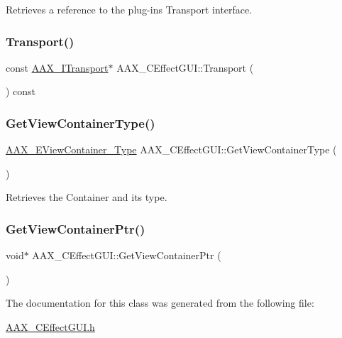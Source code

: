 Retrieves a reference to the plug-\/in\textquotesingle{}s Transport interface. 

\mbox{\label{a01477_a7330c595add500a079761e24e6067d57}} 
\subsubsection{\texorpdfstring{Transport()}{Transport()}\hspace{0.1cm}{\footnotesize\ttfamily [2/2]}}
{\footnotesize\ttfamily const \mbox{\hyperlink{a01885}{A\+A\+X\+\_\+\+I\+Transport}}$\ast$ A\+A\+X\+\_\+\+C\+Effect\+G\+U\+I\+::\+Transport (\begin{DoxyParamCaption}{ }\end{DoxyParamCaption}) const}

\mbox{\label{a01477_a010cc00926a3d219fa4de47ac182eb9b}} 
\subsubsection{\texorpdfstring{GetViewContainerType()}{GetViewContainerType()}}
{\footnotesize\ttfamily \mbox{\hyperlink{a00503_a89d5cb8c7fdb11f34e695fb0e057b764}{A\+A\+X\+\_\+\+E\+View\+Container\+\_\+\+Type}} A\+A\+X\+\_\+\+C\+Effect\+G\+U\+I\+::\+Get\+View\+Container\+Type (\begin{DoxyParamCaption}{ }\end{DoxyParamCaption})}



Retrieves the Container and it\textquotesingle{}s type. 

\mbox{\label{a01477_a0bd9e15c41584fb9a53ff5724e5db330}} 
\subsubsection{\texorpdfstring{GetViewContainerPtr()}{GetViewContainerPtr()}}
{\footnotesize\ttfamily void$\ast$ A\+A\+X\+\_\+\+C\+Effect\+G\+U\+I\+::\+Get\+View\+Container\+Ptr (\begin{DoxyParamCaption}{ }\end{DoxyParamCaption})}



The documentation for this class was generated from the following file\+:\begin{DoxyCompactItemize}
\item 
\mbox{\hyperlink{a00425}{A\+A\+X\+\_\+\+C\+Effect\+G\+U\+I.\+h}}\end{DoxyCompactItemize}
